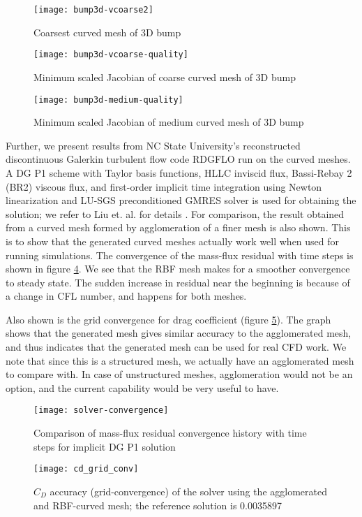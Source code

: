 \begin{figure}
 \centering
 \texttt{[image: bump3d-vcoarse2]}
 \caption{Coarsest curved mesh of 3D bump}
 \label{fig:bump3d}
\end{figure}

\begin{figure}
	\centering
	\texttt{[image: bump3d-vcoarse-quality]}
	\caption{Minimum scaled Jacobian of coarse curved mesh of 3D bump}
	\label{fig:bump3d-coarse-jac}
\end{figure}
\begin{figure}
	\centering
	\texttt{[image: bump3d-medium-quality]}
	\caption{Minimum scaled Jacobian of medium curved mesh of 3D bump}
	\label{fig:bump3d-medium-jac}
\end{figure}

Further, we present results from NC State University's reconstructed discontinuous Galerkin turbulent flow code RDGFLO run on the curved meshes. A DG P1 scheme with Taylor basis functions, HLLC inviscid flux, Bassi-Rebay 2 (BR2) viscous flux, and first-order implicit time integration using Newton linearization and LU-SGS preconditioned GMRES solver is used for obtaining the solution; we refer to Liu et. al. for details \cite{solver}. For comparison, the result obtained from a curved mesh formed by agglomeration of a finer mesh is also shown. This is to show that the generated curved meshes actually work well when used for running simulations. The convergence of the mass-flux residual with time steps is shown in figure \ref{fig:resconvergence}. We see that the RBF mesh makes for a smoother convergence to steady state. The sudden increase in residual near the beginning is because of a change in CFL number, and happens for both meshes.

Also shown is the grid convergence for drag coefficient (figure \ref{fig:gridconvergence}). The graph shows that the generated mesh gives similar accuracy to the agglomerated mesh, and thus indicates that the generated mesh can be used for real CFD work. We note that since this is a structured mesh, we actually have an agglomerated mesh to compare with. In case of unstructured meshes, agglomeration would not be an option, and the current capability would be very useful to have.
\begin{figure}
	\centering
	\texttt{[image: solver-convergence]}
	\caption{Comparison of mass-flux residual convergence history with time steps for implicit DG P1 solution}
	\label{fig:resconvergence}
\end{figure}

\begin{figure}
	\centering
	\texttt{[image: cd\_grid\_conv]}
	\caption{$C_D$ accuracy (grid-convergence) of the solver using the agglomerated and RBF-curved mesh; the reference solution \cite{case:bump3d} is 0.0035897}
	\label{fig:gridconvergence}
\end{figure}